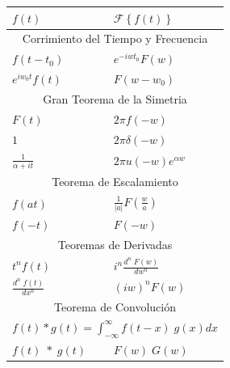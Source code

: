 \documentclass[12pt, fleqn]{report}                             %
\theoremstyle{break}                                            %
\newcommand{\FourierT}[1]   {\mathscr{F} \left\{ #1 \right\} }  %
\begin{document}
            \begin{table}[ht]
                \begin{tabular}{|m{16em}|m{16em}|@{}m{0pt}@{}}
                    \hline
                    \large{$f(t)$}          & \large{$\FourierT{f(t)}$}         &\\[2em]    \hline\hline

                    \multicolumn{3}{|c|}{Corrimiento del Tiempo y Frecuencia}   \\          \hline
                    $f(t - t_0)       $     & $e^{-iwt_0} F(w)       $          &\\[1em]    \hline
                    $e^{iw_0t} f(t)   $     & $F(w - w_0)            $          &\\[1em]    \hline\hline

                    \multicolumn{3}{|c|}{Gran Teorema de la Simetria}          \\           \hline
                    $F(t)             $     & $2\pi f(-w)             $        &\\[1em]     \hline
                    $1                $     & $2\pi \delta(-w)        $        &\\[1em]     \hline
                    $\frac{1}{\alpha + it}$ & $2\pi u(-w) e^{\alpha w}$        &\\[1em]     \hline\hline

                    \multicolumn{3}{|c|}{Teorema de Escalamiento}               \\          \hline
                    $f(at)            $     & $\frac{1}{|a|} F(\frac{w}{a})$   &\\[1em]     \hline
                    $f(-t)            $     & $F(-w)$                          &\\[1em]     \hline\hline

                    \multicolumn{3}{|c|}{Teoremas de Derivadas}                 \\          \hline
                    $t^n f(t)               $ & $i^n \frac{d^n \; F(w)}{dw^n}$ &\\[1em]     \hline
                    $\frac{d^n \;f(t)}{dx^n}$ & $(iw)^n F(w)$                  &\\[1em]     \hline\hline

                    \multicolumn{3}{|c|}{Teorema de Convolución}                \\          \hline
                    \multicolumn{3}{|c|}{
                        $f(t) * g(t) = \int_{-\infty}^\infty f(t-x) \; g(x) dx$}\\          \hline
                    $f(t) \; * \; g(t)       $ & $F(w) \; G(w)$                &\\[1em]     \hline
                \end{tabular}
            \end{table}
\end{document}
